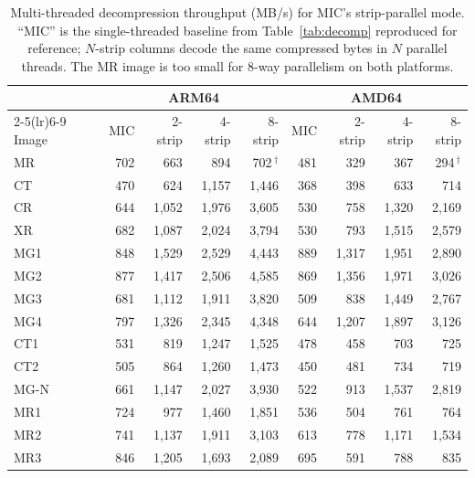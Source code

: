 \documentclass[journal]{IEEEtran}
\begin{document}
\begin{table}[htbp]
\centering
\caption{Multi-threaded decompression throughput (MB/s) for MIC's
strip-parallel mode. ``MIC'' is the single-threaded baseline from
Table~\ref{tab:decomp} reproduced for reference;
$N$-strip columns decode the same compressed bytes in $N$ parallel
threads. The MR image is too small for 8-way parallelism on both
platforms.}
\label{tab:pics}
\scriptsize
\begin{tabular}{l|rrrr|rrrr}
\toprule
 & \multicolumn{4}{c|}{ARM64} & \multicolumn{4}{c}{AMD64} \\
\cmidrule(lr){2-5}\cmidrule(lr){6-9}
Image & MIC & 2-strip & 4-strip & 8-strip & MIC & 2-strip & 4-strip & 8-strip \\
\midrule
MR   & 702   & 663   & 894     & 702\,$^\dagger$   & 481   & 329     & 367     & 294\,$^\dagger$ \\
CT   & 470   & 624   & 1{,}157 & 1{,}446           & 368   & 398     & 633     & 714 \\
CR   & 644   & 1{,}052 & 1{,}976 & 3{,}605         & 530   & 758     & 1{,}320 & 2{,}169 \\
XR   & 682   & 1{,}087 & 2{,}024 & 3{,}794         & 530   & 793     & 1{,}515 & 2{,}579 \\
MG1  & 848   & 1{,}529 & 2{,}529 & 4{,}443         & 889   & 1{,}317 & 1{,}951 & 2{,}890 \\
MG2  & 877   & 1{,}417 & 2{,}506 & 4{,}585         & 869   & 1{,}356 & 1{,}971 & 3{,}026 \\
MG3  & 681   & 1{,}112 & 1{,}911 & 3{,}820         & 509   & 838     & 1{,}449 & 2{,}767 \\
MG4  & 797   & 1{,}326 & 2{,}345 & 4{,}348         & 644   & 1{,}207 & 1{,}897 & 3{,}126 \\
CT1  & 531   & 819   & 1{,}247 & 1{,}525           & 478   & 458     & 703     & 725 \\
CT2  & 505   & 864   & 1{,}260 & 1{,}473           & 450   & 481     & 734     & 719 \\
MG-N & 661   & 1{,}147 & 2{,}027 & 3{,}930         & 522   & 913     & 1{,}537 & 2{,}819 \\
MR1  & 724   & 977   & 1{,}460 & 1{,}851           & 536   & 504     & 761     & 764 \\
MR2  & 741   & 1{,}137 & 1{,}911 & 3{,}103         & 613   & 778     & 1{,}171 & 1{,}534 \\
MR3  & 846   & 1{,}205 & 1{,}693 & 2{,}089         & 695   & 591     & 788     & 835 \\

\end{tabular}
\end{table}
\end{document}
